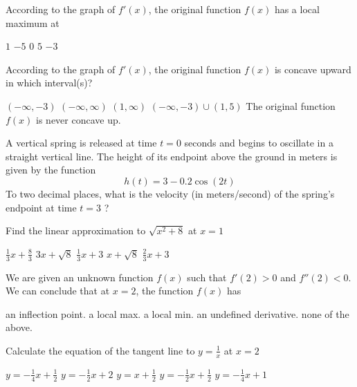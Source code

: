 \documentclass[11pt]{article}
\begin{document}
\begin{questions}
\begin{multiplechoice}{5}
\question According to the graph of $f'(x)$, the original function $f(x)$ has a local maximum at
\begin{answers}{3}
\ans $1$
\ans $-5$
\ans $0$
\ans $5$
\ans $-3$
\end{answers}


\question According to the graph of $f'(x)$, the original function $f(x)$ is concave upward in which interval(s)?
\begin{answers}{2}
\ans $(-\infty, -3)$
\ans $(-\infty, \infty)$
\ans $(1, \infty)$
\ans $(-\infty, -3) \cup (1,5)$
\ans The original function $f(x)$ is never concave up.
\end{answers}



\question A vertical spring is released at time $t = 0$ seconds and begins to oscillate in a straight vertical line.
The height of its endpoint above the ground in meters is given by the function
$$h(t) = 3 - 0.2\cos(2t)$$
To two decimal places, what is the velocity (in meters/second) of the spring's endpoint at time $t = 3$ ?
\begin{answers}{3}
\end{answers}

\newpage

\question Find the linear approximation to $\sqrt{x^2+8}$ at $x = 1$
\begin{answers}{2}
\ans $\frac{1}{3} x + \frac{8}{3}$
\ans $3x + \sqrt{8}$
\ans $\frac{1}{3} x + 3$
\ans $x + \sqrt{8}$
\ans $\frac{2}{3}x + 3$
\end{answers}


\question We are given an unknown function $f(x)$ such that $f'(2) > 0$ and $f''(2) < 0$.
We can conclude that at $x = 2$, the function $f(x)$ has 
\begin{answers}{2}
\ans an inflection point.
\ans a local max.
\ans a local min.
\ans an undefined derivative.
\ans none of the above.
\end{answers}

\question Calculate the equation of the tangent line to $y = \frac{1}{x}$ at $x = 2$
\begin{answers}{2}
\ans $y = -\frac{1}{4}x + \frac{1}{2}$
\ans $y = -\frac{1}{2}x + 2$
\ans $y = x + \frac{1}{2}$
\ans $y = -\frac{1}{2}x + \frac{1}{2}$
\ans $y = -\frac{1}{4}x + 1$
\end{answers}








\end{multiplechoice}
\end{questions}
\end{document}
